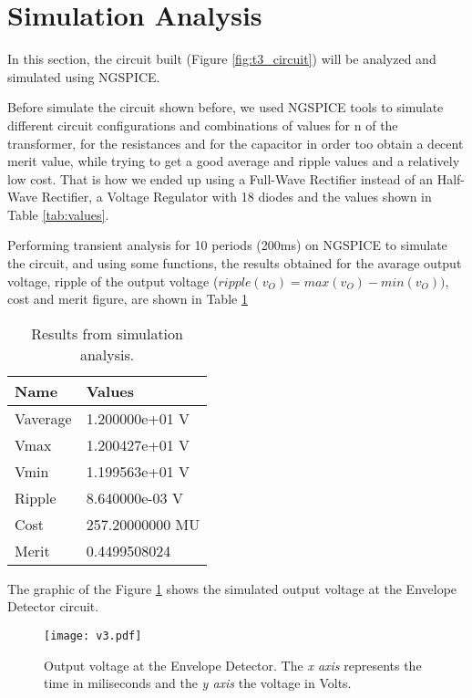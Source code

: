 \newpage
{}
\section{Simulation Analysis}
\label{sec:simulation}

In this section, the circuit built (Figure \ref{fig:t3_circuit}) will be analyzed and simulated using NGSPICE. 

Before simulate the circuit shown before, we used NGSPICE tools to simulate different circuit configurations and combinations of values for n of the transformer, for the resistances and for the capacitor in order too obtain a decent merit value, while trying to get a good average and ripple values and a relatively low cost. That is how we ended up using a Full-Wave Rectifier instead of an Half-Wave Rectifier, a Voltage Regulator with 18 diodes and the values shown in Table \ref{tab:values}.

Performing transient analysis for 10 periods (200ms) on NGSPICE to simulate the circuit, and using some functions, the results obtained for the avarage output voltage, ripple of the output voltage ($ripple(v_O)=max(v_O)-min(v_O))$, cost and merit figure, are shown in Table \ref{tab:valuessim} 

\begin{table}[h]
	\centering
	\begin{tabular}{|l|l|}
		\hline
		\textbf{Name} & \textbf{Values} \\ \hline
		Vaverage & 1.200000e+01 V \\ \hline
		Vmax & 1.200427e+01 V \\ \hline
		Vmin & 1.199563e+01 V \\ \hline
		Ripple & 8.640000e-03 V \\ \hline
		Cost & 257.20000000 MU \\ \hline
		Merit & 0.4499508024 \\ \hline
	\end{tabular}
	\caption{Results from simulation analysis.}
	\label{tab:valuessim}
\end{table}

The graphic of the Figure \ref{fig:sim_envelope} shows the simulated output voltage at the Envelope Detector circuit.


\begin{figure}[H] \centering
\texttt{[image: v3.pdf]}
\caption{Output voltage at the Envelope Detector. The \textit{x axis} represents the time in miliseconds and the \textit{y axis} the voltage in Volts.}
\label{fig:sim_envelope}
\end{figure}

